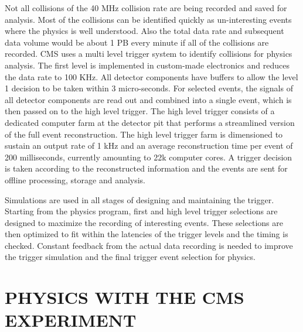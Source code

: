 \documentclass{wscpaperproc}
\theoremstyle{wsc}
\begin{document}
Not all collisions of the 40 MHz collision rate are being recorded and saved for analysis. Most of the collisions can be identified quickly as un-interesting events where the physics is well understood. Also the total data rate and subsequent data volume would be about 1 PB every minute if all of the collisions are recorded. CMS uses a multi level trigger system to identify collisions for physics analysis. The first level is implemented in custom-made electronics and reduces the data rate to 100 KHz. All detector components have buffers to allow the level 1 decision to be taken within 3 micro-seconds. For selected events, the signals of all detector components are read out and combined into a single event, which is then passed on to the high level trigger. The high level trigger consists of a dedicated computer farm at the detector pit that performs a streamlined version of the full event reconstruction. The high level trigger farm is dimensioned to sustain an output rate of 1 kHz and an average reconstruction time per event of 200 milliseconds, currently amounting to 22k computer cores. A trigger decision is taken according to the reconstructed information and the events are sent for offline processing, storage and analysis.

Simulations are used in all stages of designing and maintaining the trigger. Starting from the physics program, first and high level trigger selections are designed to maximize the recording of interesting events. These selections are then optimized to fit within the latencies of the trigger levels and the timing is checked. Constant feedback from the actual data recording is needed to improve the trigger simulation and the final trigger event selection for physics.

\section{PHYSICS WITH THE CMS EXPERIMENT}
\label{sec:physics}
\end{document}
